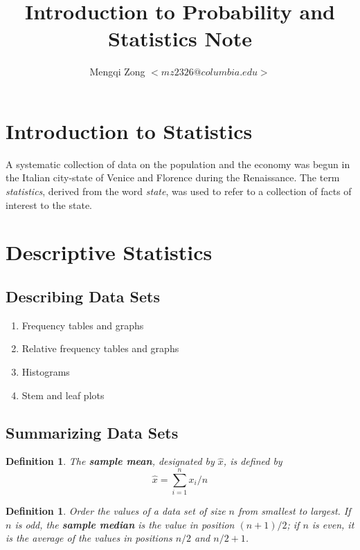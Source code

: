 \documentclass[12pt]{article}
\title{Introduction to Probability and Statistics Note}
\author{Mengqi Zong $<mz2326@columbia.edu>$}
\newtheorem{definition}[theorem]{Definition}
\begin{document}
\setcounter{tocdepth}{5} %
\setcounter{secnumdepth}{5} %

\maketitle

\tableofcontents

\setlength{\parindent}{0in}

\section{Introduction to Statistics}

A systematic collection of data on the population and the economy was begun in the Italian city-state of Venice and Florence during the Renaissance. The term \emph{statistics}, derived from the word \emph{state}, was used to refer to a collection of facts of interest to the state.

\section{Descriptive Statistics}

\subsection{Describing Data Sets}
\begin{enumerate}
  \item Frequency tables and graphs
  \item Relative frequency tables and graphs
  \item Histograms
  \item Stem and leaf plots
\end{enumerate}

\subsection{Summarizing Data Sets}

\begin{definition}
  The \textbf{sample mean}, designated by $\hat{x}$, is defined by
  \begin{equation*}
    \hat{x} = \sum_{i=1}^n x_i / n
  \end{equation*}
\end{definition}

\begin{definition}
  Order the values of a data set of size $n$ from smallest to largest. If $n$ is odd, the \textbf{sample median} is the value in position $(n+1)/2$; if $n$ is even, it is the average of the values in positions $n/2$ and $n/2+1$.
\end{definition}
\end{document}
